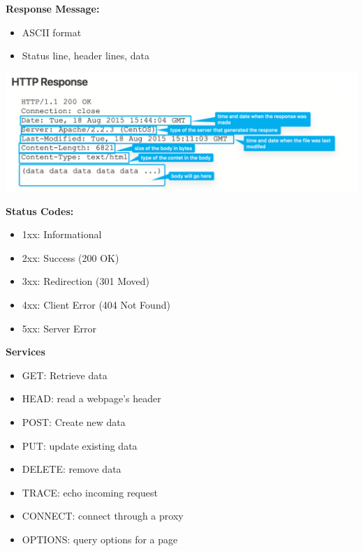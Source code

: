 \documentclass[letterpaper, 8pt]{extarticle}
\begin{document}
\begin{multicols*}{4}
	\textbf{Response Message:}
	\begin{itemize}
		\item ASCII format
		\item Status line, header lines, data
	\end{itemize}
	\includegraphics[width=\linewidth]{http-response.png}

	\textbf{Status Codes:}
	\begin{itemize}
		\item 1xx: Informational
		\item 2xx: Success (200 OK)
		\item 3xx: Redirection (301 Moved)
		\item 4xx: Client Error (404 Not Found)
		\item 5xx: Server Error
	\end{itemize}

	\textbf{Services}
	\begin{itemize}
		\item GET: Retrieve data
		\item HEAD: read a webpage's header
		\item POST: Create new data
		\item PUT: update existing data
		\item DELETE: remove data
		\item TRACE: echo incoming request
		\item CONNECT: connect through a proxy
		\item OPTIONS: query options for a page
	\end{itemize}


\end{multicols*}
\end{document}
